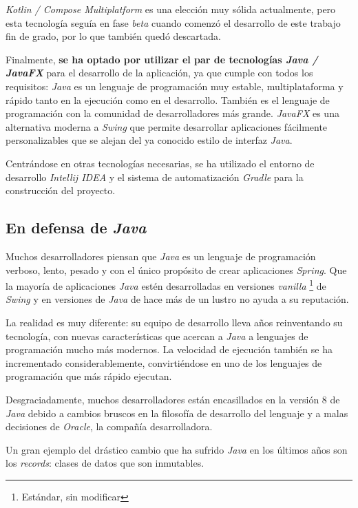\textit{Kotlin / Compose Multiplatform} es una elección muy sólida actualmente,
pero esta tecnología seguía en fase \textit{beta} cuando comenzó el desarrollo
de este trabajo fin de grado, por lo que también quedó descartada.

Finalmente, \textbf{se ha optado por utilizar el par de tecnologías \textit{Java / JavaFX}}
para el desarrollo de la aplicación, ya que cumple con todos los requisitos: \textit{Java} es un
lenguaje de programación muy estable, multiplataforma y rápido tanto en la ejecución como en
el desarrollo.
También es el lenguaje de programación con la comunidad de desarrolladores más grande.
\textit{JavaFX} es una alternativa moderna a \textit{Swing} que permite desarrollar aplicaciones
fácilmente personalizables que se alejan del ya conocido estilo de interfaz \textit{Java}.

Centrándose en otras tecnologías necesarias, se ha utilizado el entorno de desarrollo
\textit{Intellij IDEA}\cite{INTELLIJIDEA} y el sistema de
automatización \textit{Gradle} para la construcción del proyecto.

\subsection{En defensa de \textit{Java}}\label{subsec:en-defensa-de-java}

Muchos desarrolladores piensan que \textit{Java} es un lenguaje de programación verboso, lento, pesado
y con el único propósito de crear aplicaciones \textit{Spring}.
Que la mayoría de aplicaciones \textit{Java} estén desarrolladas en versiones \textit{vanilla}
\footnote{Estándar, sin modificar} de \textit{Swing} y en versiones de \textit{Java} de hace más
de un lustro no ayuda a su reputación.

La realidad es muy diferente: su equipo de desarrollo lleva años reinventando
su tecnología, con nuevas características que acercan a \textit{Java} a lenguajes
de programación mucho más modernos.
La velocidad de ejecución también se ha incrementado considerablemente,
convirtiéndose en uno de los lenguajes de programación que más rápido ejecutan.

Desgraciadamente, muchos desarrolladores están encasillados en la versión
8 de \textit{Java} debido a cambios bruscos en la filosofía de desarrollo
del lenguaje y a malas decisiones de \textit{Oracle}, la compañía desarrolladora.

Un gran ejemplo del drástico cambio que ha sufrido \textit{Java} en los últimos años son los
\textit{records}: clases de datos que son inmutables.

